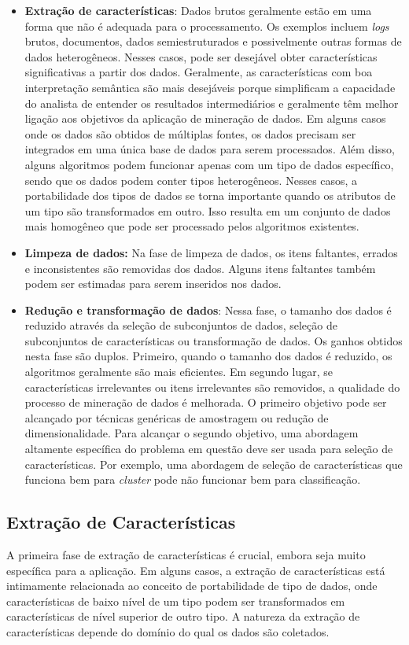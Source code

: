 \begin{itemize}
  \item
\textbf{Extração de características}: Dados brutos geralmente estão em uma forma que não é adequada para o processamento. Os exemplos incluem \textit{logs} brutos, documentos, dados semiestruturados e possivelmente outras formas de dados heterogêneos. Nesses casos, pode ser desejável obter características significativas a partir dos dados. Geralmente, as características com boa interpretação semântica são mais desejáveis porque simplificam a capacidade do analista de entender os resultados intermediários e geralmente têm melhor ligação aos objetivos da aplicação de mineração de dados. Em alguns casos onde os dados são obtidos de múltiplas fontes, os dados precisam ser integrados em uma única base de dados para serem processados. Além disso, alguns algoritmos podem funcionar apenas com um tipo de dados específico, sendo que os dados podem conter tipos heterogêneos. Nesses casos, a portabilidade dos tipos de dados se torna importante quando os atributos de um tipo são transformados em outro. Isso resulta em um conjunto de dados mais homogêneo que pode ser processado pelos algoritmos existentes.
  \item
\textbf{Limpeza de dados:} Na fase de limpeza de dados, os itens faltantes, errados e inconsistentes são removidas dos dados. Alguns itens faltantes também podem ser estimadas para serem inseridos nos dados.
  \item
\textbf{Redução e transformação de dados}: Nessa fase, o tamanho dos dados é reduzido através da seleção de subconjuntos de dados, seleção de subconjuntos de características ou transformação de dados. Os ganhos obtidos nesta fase são duplos. Primeiro, quando o tamanho dos dados é reduzido, os algoritmos geralmente são mais eficientes. Em segundo lugar, se características irrelevantes ou itens irrelevantes são removidos, a qualidade do processo de mineração de dados é melhorada. O primeiro objetivo pode ser alcançado por técnicas genéricas de amostragem ou redução de dimensionalidade. Para alcançar o segundo objetivo, uma abordagem altamente específica do problema em questão deve ser usada para seleção de características. Por exemplo, uma abordagem de seleção de características que funciona bem para \textit{cluster} pode não funcionar bem para classificação.
\end{itemize}

\subsection{Extração de Características}
A primeira fase de extração de características é crucial, embora seja muito específica para a aplicação. Em alguns casos, a extração de características está intimamente relacionada ao conceito de portabilidade de tipo de dados, onde características de baixo nível de um tipo podem ser transformados em características de nível superior de outro tipo. A natureza da extração de características depende do domínio do qual os dados são coletados.

